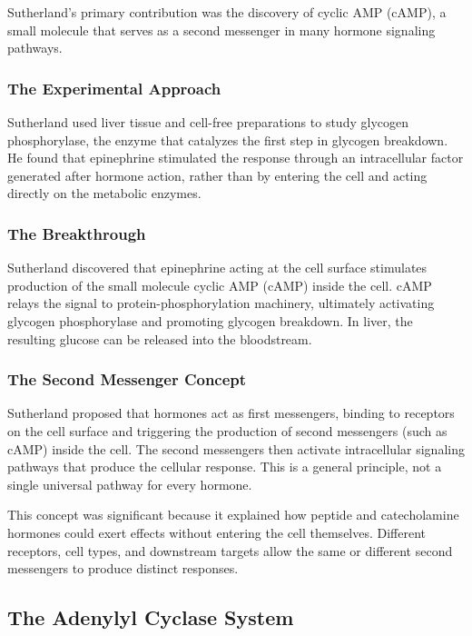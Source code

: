 Sutherland's primary contribution was the discovery of cyclic AMP (cAMP), a small molecule that serves as a second messenger in many hormone signaling pathways.

\subsubsection{The Experimental Approach}

Sutherland used liver tissue and cell-free preparations to study glycogen phosphorylase, the enzyme that catalyzes the first step in glycogen breakdown. He found that epinephrine stimulated the response through an intracellular factor generated after hormone action, rather than by entering the cell and acting directly on the metabolic enzymes.

\subsubsection{The Breakthrough}

Sutherland discovered that epinephrine acting at the cell surface stimulates production of the small molecule cyclic AMP (cAMP) inside the cell. cAMP relays the signal to protein-phosphorylation machinery, ultimately activating glycogen phosphorylase and promoting glycogen breakdown. In liver, the resulting glucose can be released into the bloodstream.

\subsubsection{The Second Messenger Concept}

Sutherland proposed that hormones act as first messengers, binding to receptors on the cell surface and triggering the production of second messengers (such as cAMP) inside the cell. The second messengers then activate intracellular signaling pathways that produce the cellular response. This is a general principle, not a single universal pathway for every hormone.

This concept was significant because it explained how peptide and catecholamine hormones could exert effects without entering the cell themselves. Different receptors, cell types, and downstream targets allow the same or different second messengers to produce distinct responses.

\subsection{The Adenylyl Cyclase System}

